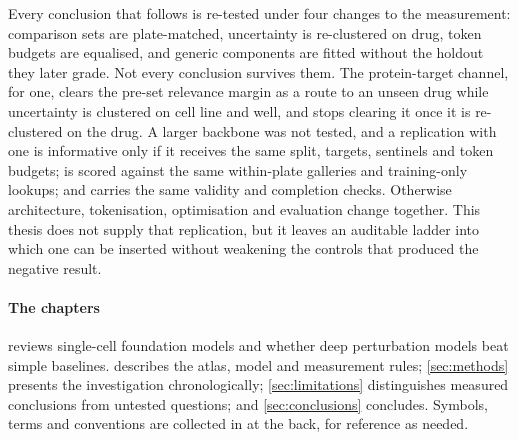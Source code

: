 Every conclusion that follows is re-tested under four changes to the
measurement: comparison sets are plate-matched, uncertainty is re-clustered on
drug, token budgets are equalised, and generic components are fitted without the
holdout they later grade. Not every conclusion survives them. The protein-target channel, for one, clears the pre-set relevance margin as a route to an unseen drug while uncertainty is clustered on cell line and well, and stops clearing it once it is re-clustered on the drug. A larger backbone was not tested, and a replication
with one is informative only if it receives the same split, targets, sentinels
and token budgets; is scored against the same
within-plate galleries and training-only lookups; and carries the same validity
and completion checks. Otherwise architecture, tokenisation, optimisation and
evaluation change together. This thesis does not supply that replication, but it
leaves an auditable ladder into which one can be inserted without weakening the
controls that produced the negative result.

\paragraph{The chapters}  reviews single-cell foundation
models and whether deep perturbation models beat simple baselines.
 describes the atlas, model and measurement rules;
\cref{sec:methods} presents the investigation chronologically;
\cref{sec:limitations} distinguishes measured conclusions from untested questions;
and \cref{sec:conclusions} concludes. Symbols, terms and conventions are collected
in  at the back, for reference as needed.
